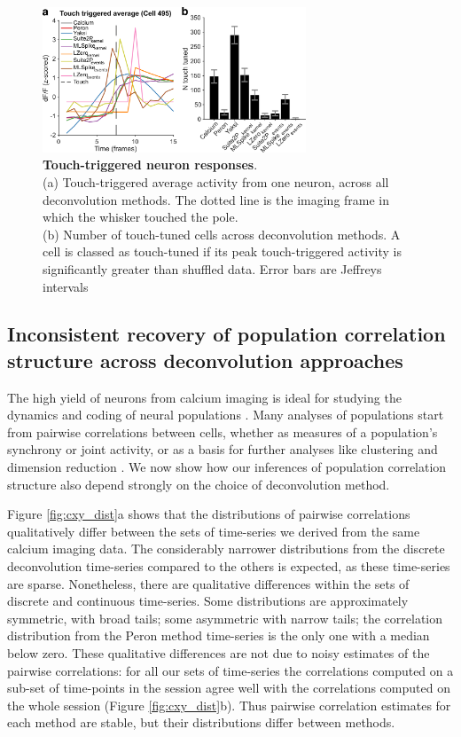 \documentclass[a4paper,11pt]{article}
\begin{document}
\begin{figure}
	\centering
\includegraphics[width=0.7\textwidth]{composite_figs/fig6_touch_tuning}
\caption{\label{fig:touch_triggered} \textbf{Touch-triggered neuron responses}. \\ 	
	(a) Touch-triggered average activity from one neuron, across all deconvolution methods. The dotted line is the imaging frame in which the whisker touched the pole. \\
	(b) Number of touch-tuned cells across deconvolution methods. A cell is classed as touch-tuned if its peak touch-triggered activity is significantly greater than shuffled data. Error bars are Jeffreys intervals}
\end{figure}


\subsection{Inconsistent recovery of population correlation structure across deconvolution approaches}
The high yield of neurons from calcium imaging is ideal for studying the dynamics and coding of neural populations \citep{Harvey2012-bh,Huber2012-mi,Kato2015-sb}. Many analyses of populations start from pairwise correlations between cells, whether as measures of a population's synchrony or joint activity, or as a basis for further analyses like clustering and dimension reduction \citep{Cunningham2014-vd}. We now show how our inferences of population correlation structure also depend strongly on the choice of deconvolution method.

Figure \ref{fig:cxy_dist}a shows that the distributions of pairwise correlations qualitatively differ between the sets of time-series we derived from the same calcium imaging data. The considerably narrower distributions from the discrete deconvolution time-series compared to the others is expected, as these time-series are sparse. Nonetheless, there are qualitative differences within the sets of discrete and continuous time-series. Some distributions are approximately symmetric, with broad tails; some asymmetric with narrow tails; the correlation distribution from the Peron method time-series is the only one with a median below zero. These qualitative differences are not due to noisy estimates of the pairwise correlations: for all our sets of time-series the correlations computed on a sub-set of time-points in the session agree well with the correlations computed on the whole session (Figure \ref{fig:cxy_dist}b). Thus pairwise correlation estimates for each method are stable, but their distributions differ between methods.
\end{document}
